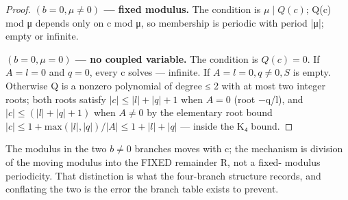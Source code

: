 \documentclass[11pt]{article}
\theoremstyle{plain}
\theoremstyle{definition}
\theoremstyle{remark}
\theoremstyle{plain}
\theoremstyle{definition}
\theoremstyle{remark}
\theoremstyle{plain}
\theoremstyle{definition}
\theoremstyle{remark}
\begin{document}
\begin{proof}
\textbf{$(b = 0, μ ≠ 0)$ — fixed modulus.} The condition is $μ ∣ Q(c)$; Q(c) mod μ depends only on c mod μ, so membership is periodic with period |μ|; empty or infinite.

\textbf{$(b = 0, μ = 0)$ — no coupled variable.} The condition is $Q(c) = 0$. If $A = l = 0$ and $q = 0$, every c solves — infinite. If $A = l = 0, q ≠ 0, S$ is empty. Otherwise Q is a nonzero polynomial of degree ≤ 2 with at most two integer roots; both roots satisfy $|c| ≤ |l| + |q| + 1$ when $A = 0$ (root −q/l), and $|c| ≤ (|l|+|q|+1)$ when $A ≠ 0$ by the elementary root bound $|c| ≤ 1 + \mathrm{max}(|l|,|q|)/|A| ≤ 1 + |l| + |q|$ — inside the K₄ bound.

\end{proof}
The modulus in the two $b ≠ 0$ branches moves with c; the mechanism is division of the moving modulus into the FIXED remainder R, not a fixed- modulus periodicity. That distinction is what the four-branch structure records, and conflating the two is the error the branch table exists to prevent.
\end{document}
